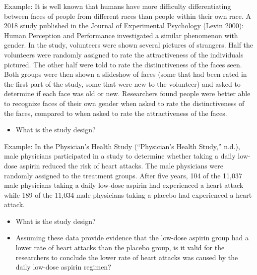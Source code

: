 \documentclass[
]{report}
\providecommand{\tightlist}{%
  \setlength{\itemsep}{0pt}\setlength{\parskip}{0pt}}
\begin{document}
Example: It is well known that humans have more difficulty differentiating between faces of people from different races than people within their own race. A 2018 study published in the Journal of Experimental Psychology (Levin 2000): Human Perception and Performance investigated a similar phenomenon with gender. In the study, volunteers were shown several pictures of strangers. Half the volunteers were randomly assigned to rate the attractiveness of the individuals pictured. The other half were told to rate the distinctiveness of the faces seen. Both groups were then shown a slideshow of faces (some that had been rated in the first part of the study, some that were new to the volunteer) and asked to determine if each face was old or new. Researchers found people were better able to recognize faces of their own gender when asked to rate the distinctiveness of the faces, compared to when asked to rate the attractiveness of the faces.

\begin{itemize}
\tightlist
\item
  What is the study design?
\end{itemize}

\vspace{0.5in}

Example: In the Physician's Health Study ({``Physician's Health Study,''} n.d.), male physicians participated in a study to determine whether taking a daily low-dose aspirin reduced the risk of heart attacks. The male physicians were randomly assigned to the treatment groups. After five years, 104 of the 11,037 male physicians taking a daily low-dose aspirin had experienced a heart attack while 189 of the 11,034 male physicians taking a placebo had experienced a heart attack.

\begin{itemize}
\tightlist
\item
  What is the study design?
\end{itemize}

\vspace{0.5in}

\begin{itemize}
\tightlist
\item
  Assuming these data provide evidence that the low-dose aspirin group had a lower rate of heart attacks than the placebo group, is it valid for the researchers to conclude the lower rate of heart attacks was caused by the daily low-dose aspirin regimen?
\end{itemize}
\end{document}
